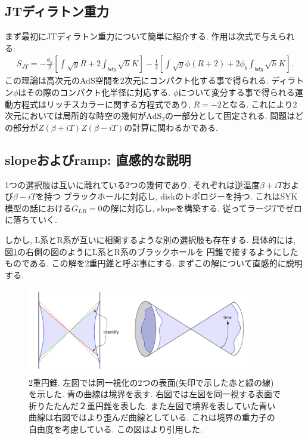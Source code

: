 \subsection{JTディラトン重力}
まず最初にJTディラトン重力について簡単に紹介する. 
作用は次式で与えられる:
\begin{align}
	S_{JT} = -\frac{\phi_0}{2}\left[\int \sqrt{g}R + 2\int_{bdy}\sqrt{h}K \right]
			-\frac{1}{2}\left[
				\int \sqrt{g}\phi(R+2) + 2\phi_b\int_{bdy}\sqrt{h}K
			\right].
	\label{eq:JTgravity}
\end{align}
この理論は高次元のAdS空間を2次元にコンパクト化する事で得られる. 
ディラトン$\phi$はその際のコンパクト化半径に対応する. 
$\phi$について変分する事で得られる運動方程式はリッチスカラーに関する方程式であり, $R = -2$となる. 
これにより2次元においては局所的な時空の幾何が$\mathrm{AdS}_2$の一部分として固定される. 
問題はどの部分が$Z(\beta + iT)Z(\beta - iT)$の計算に関わるかである. 

\subsection{slopeおよびramp: 直感的な説明}
1つの選択肢は互いに離れている2つの幾何であり, それぞれは逆温度$\beta + iT$および$\beta - iT$を持つ
ブラックホールに対応し, diskのトポロジーを持つ. 
これはSYK模型の話における$G_{LR} = 0$の解に対応し, slopeを構築する. 
従ってラージ$T$でゼロに落ちていく. 

しかし, L系とR系が互いに相関するような別の選択肢も存在する. 
具体的には, 図\ref{fig:double_cone}の右側の図のようにL系とR系のブラックホールを
円錐で接するようにしたものである. この解を2重円錐と呼ぶ事にする. 
まずこの解について直感的に説明する. 

\begin{figure}[ht]
	\centering
	\includegraphics[width=10cm]{figures/double_cone}
	\caption{
	2重円錐. 左図では同一視化の2つの表面(矢印で示した赤と緑の線)を示した. 
	青の曲線は境界を表す. 
	右図では左図を同一視する表面で折りたたんだ２重円錐を表した. 
	また左図で境界を表していた青い曲線は右図ではより歪んだ曲線としている. 
	これは境界の重力子の自由度を考慮している. 
	この図は\cite{polchinski_chaos}より引用した. }
	\label{fig:double_cone}
\end{figure}

